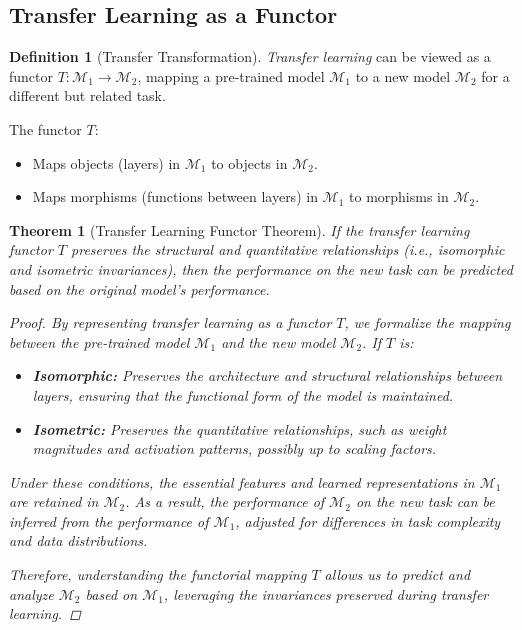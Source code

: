 \documentclass{article}
\newtheorem{theorem}{Theorem}[section]
\theoremstyle{definition}
\newtheorem{definition}{Definition}[section]
\theoremstyle{remark}
\begin{document}
	\subsection{Transfer Learning as a Functor}
	
	\begin{definition}[Transfer Transformation]
		\emph{Transfer learning} can be viewed as a functor $T: \mathcal{M}_1 \rightarrow \mathcal{M}_2$, mapping a pre-trained model $\mathcal{M}_1$ to a new model $\mathcal{M}_2$ for a different but related task.
		
		The functor $T$:
		\begin{itemize}
			\item Maps objects (layers) in $\mathcal{M}_1$ to objects in $\mathcal{M}_2$.
			\item Maps morphisms (functions between layers) in $\mathcal{M}_1$ to morphisms in $\mathcal{M}_2$.
		\end{itemize}
	\end{definition}
	
	\begin{theorem}[Transfer Learning Functor Theorem]
		If the transfer learning functor $T$ preserves the structural and quantitative relationships (i.e., isomorphic and isometric invariances), then the performance on the new task can be predicted based on the original model's performance.
		
		\begin{proof}
			By representing transfer learning as a functor $T$, we formalize the mapping between the pre-trained model $\mathcal{M}_1$ and the new model $\mathcal{M}_2$. If $T$ is:
			\begin{itemize}
				\item \textbf{Isomorphic:} Preserves the architecture and structural relationships between layers, ensuring that the functional form of the model is maintained.
				\item \textbf{Isometric:} Preserves the quantitative relationships, such as weight magnitudes and activation patterns, possibly up to scaling factors.
			\end{itemize}
			
			Under these conditions, the essential features and learned representations in $\mathcal{M}_1$ are retained in $\mathcal{M}_2$. As a result, the performance of $\mathcal{M}_2$ on the new task can be inferred from the performance of $\mathcal{M}_1$, adjusted for differences in task complexity and data distributions.
			
			Therefore, understanding the functorial mapping $T$ allows us to predict and analyze $\mathcal{M}_2$ based on $\mathcal{M}_1$, leveraging the invariances preserved during transfer learning.
		\end{proof}
	\end{theorem}
	
\end{document}
